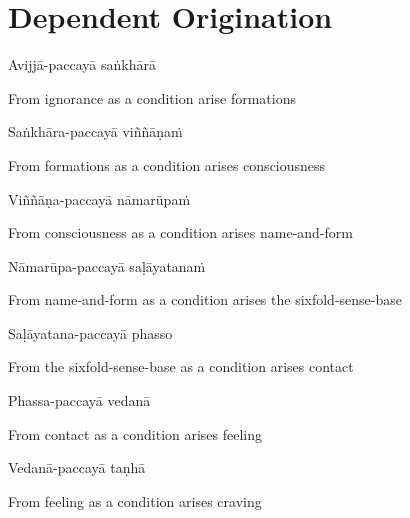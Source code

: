 
\clearpage

\section{Dependent Origination}

\begin{leader}
\end{leader}
\begin{leader}
\end{leader}

Avijjā-paccayā saṅkhārā

\begin{cprenglish}
  From ignorance as a condition arise formations
\end{cprenglish}

Saṅkhāra-paccayā viññāṇaṁ

\begin{cprenglish}
  From formations as a condition arises consciousness
\end{cprenglish}

Viññāṇa-paccayā nāmarūpaṁ

\begin{cprenglish}
  From consciousness as a condition arises name-and-form
\end{cprenglish}

Nāmarūpa-paccayā saḷāyatanaṁ

\begin{cprenglish}
  From name-and-form as a condition arises the sixfold-sense-base
\end{cprenglish}

Saḷāyatana-paccayā phasso

\begin{cprenglish}
  From the sixfold-sense-base as a condition arises contact
\end{cprenglish}

Phassa-paccayā vedanā

\begin{cprenglish}
  From contact as a condition arises feeling
\end{cprenglish}

Vedanā-paccayā taṇhā

\begin{cprenglish}
  From feeling as a condition arises craving
\end{cprenglish}

